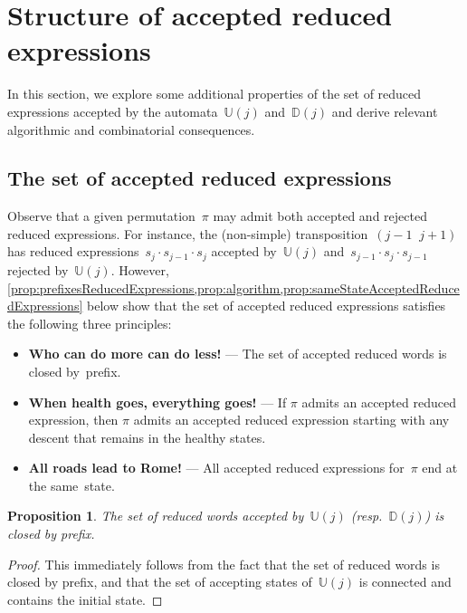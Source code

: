 \documentclass{amsart}
\newtheorem{proposition}[theorem]{Proposition}
\newcommand{\automatonU}{\mathbb{U}} %
\newcommand{\automatonD}{\mathbb{D}} %
\begin{document}

\pagebreak
\section{Structure of accepted reduced expressions}\label{sec:algorithmicCombinatorialConsequences}

In this section, we explore some additional properties of the set of reduced expressions accepted by the automata~$\automatonU(j)$ and~$\automatonD(j)$ and derive relevant algorithmic and combinatorial consequences.

\subsection{The set of accepted reduced expressions}\label{subsec:principles}

Observe that a given permutation~$\pi$ may admit both accepted and rejected reduced expressions.
For instance, the (non-simple) transposition~${(j-1 \;\; j+1)}$ has reduced expressions~$s_j \cdot s_{j-1} \cdot s_j$ accepted by~$\automatonU(j)$ and~$s_{j-1} \cdot s_j \cdot s_{j-1}$ rejected by~$\automatonU(j)$.
However, \cref{prop:prefixesReducedExpressions,prop:algorithm,prop:sameStateAcceptedReducedExpressions} below show that the set of accepted reduced expressions satisfies the following three principles:
\begin{itemize}
	\item \textbf{Who can do more can do less!} --- The set of accepted reduced words is closed by~prefix.
	\item \textbf{When health goes, everything goes!} --- If $\pi$ admits an accepted reduced expression, then $\pi$ admits an accepted reduced expression starting with any descent that remains in the healthy states.
	\item \textbf{All roads lead to Rome!} --- All accepted reduced expressions for~$\pi$ end at the same~state.
\end{itemize}

\begin{proposition}\label{prop:prefixesReducedExpressions}
The set of reduced words accepted by~$\automatonU(j)$ (resp.~$\automatonD(j)$) is closed by prefix.
\end{proposition}

\begin{proof}
This immediately follows from the fact that the set of reduced words is closed by prefix, and that the set of accepting states of~$\automatonU(j)$ is connected and contains the initial state.
\end{proof}
\end{document}
